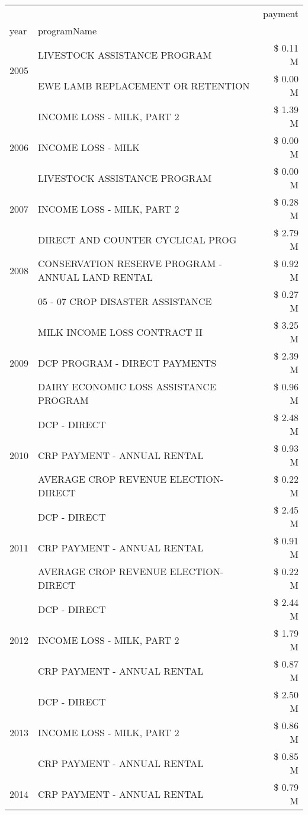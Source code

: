\begin{tabular}{llr}
\toprule
 &  & payment \\
year & programName &  \\
\midrule
\multirow[t]{2}{*}{2005} & LIVESTOCK ASSISTANCE PROGRAM & \$ 0.11 M \\
 & EWE LAMB REPLACEMENT OR RETENTION & \$ 0.00 M \\
\cline{1-3}
\multirow[t]{3}{*}{2006} & INCOME LOSS - MILK, PART 2 & \$ 1.39 M \\
 & INCOME LOSS - MILK & \$ 0.00 M \\
 & LIVESTOCK ASSISTANCE PROGRAM & \$ 0.00 M \\
\cline{1-3}
2007 & INCOME LOSS - MILK, PART 2 & \$ 0.28 M \\
\cline{1-3}
\multirow[t]{3}{*}{2008} & DIRECT AND COUNTER CYCLICAL PROG & \$ 2.79 M \\
 & CONSERVATION RESERVE PROGRAM - ANNUAL LAND RENTAL & \$ 0.92 M \\
 & 05 - 07 CROP DISASTER ASSISTANCE & \$ 0.27 M \\
\cline{1-3}
\multirow[t]{3}{*}{2009} & MILK INCOME LOSS CONTRACT II & \$ 3.25 M \\
 & DCP PROGRAM - DIRECT PAYMENTS & \$ 2.39 M \\
 & DAIRY ECONOMIC LOSS ASSISTANCE PROGRAM & \$ 0.96 M \\
\cline{1-3}
\multirow[t]{3}{*}{2010} & DCP - DIRECT & \$ 2.48 M \\
 & CRP PAYMENT - ANNUAL RENTAL & \$ 0.93 M \\
 & AVERAGE CROP REVENUE ELECTION-DIRECT & \$ 0.22 M \\
\cline{1-3}
\multirow[t]{3}{*}{2011} & DCP - DIRECT & \$ 2.45 M \\
 & CRP PAYMENT - ANNUAL RENTAL & \$ 0.91 M \\
 & AVERAGE CROP REVENUE ELECTION-DIRECT & \$ 0.22 M \\
\cline{1-3}
\multirow[t]{3}{*}{2012} & DCP - DIRECT & \$ 2.44 M \\
 & INCOME LOSS - MILK, PART 2 & \$ 1.79 M \\
 & CRP PAYMENT - ANNUAL RENTAL & \$ 0.87 M \\
\cline{1-3}
\multirow[t]{3}{*}{2013} & DCP - DIRECT & \$ 2.50 M \\
 & INCOME LOSS - MILK, PART 2 & \$ 0.86 M \\
 & CRP PAYMENT - ANNUAL RENTAL & \$ 0.85 M \\
\cline{1-3}
\multirow[t]{3}{*}{2014} & CRP PAYMENT - ANNUAL RENTAL & \$ 0.79 M \\

\end{tabular}
